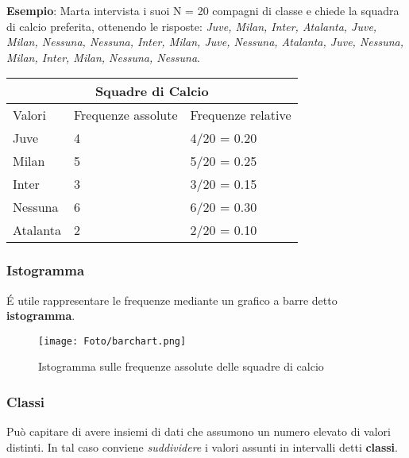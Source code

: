 \begin{tcolorbox}
    \textbf{Esempio}: Marta intervista i suoi N = 20 compagni di classe e chiede la squadra di calcio preferita, ottenendo le risposte: \newline \textit{Juve, Milan, Inter, Atalanta, Juve, Milan, Nessuna, Nessuna, Inter, Milan, Juve, Nessuna, Atalanta, Juve, Nessuna, Milan, Inter, Milan, Nessuna, Nessuna}. \newline
    
    \begin{tabular}{ |p{3.5cm}|p{3.5cm}|p{3.5cm}|  }
        \hline
        \multicolumn{3}{|c|}{Squadre di Calcio} \\
        \hline
        Valori & Frequenze assolute & Frequenze relative \\
        \hline
        Juve & 4 & 4/20 = 0.20 \\
        Milan & 5 & 5/20 = 0.25 \\
        Inter & 3 & 3/20 = 0.15 \\
        Nessuna & 6 & 6/20 = 0.30 \\
        Atalanta & 2 & 2/20 = 0.10 \\
        \hline
    \end{tabular}
\end{tcolorbox}

\subsubsection{Istogramma}

É utile rappresentare le frequenze mediante un grafico a barre detto \textbf{istogramma}. \newline

\begin{figure}[htbp]
    \centering
    \texttt{[image: Foto/barchart.png]}
    \color{gray}
    \caption{Istogramma sulle frequenze assolute delle squadre di calcio} 
\end{figure}

\newpage
\subsubsection{Classi}

Può capitare di avere insiemi di dati che assumono un numero elevato di valori distinti. In tal caso conviene \textit{suddividere} i valori assunti in intervalli detti \textbf{classi}. \newline

